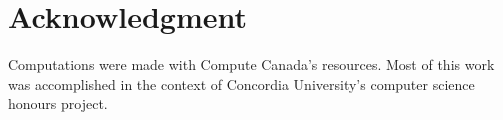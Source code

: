 \documentclass[conference]{IEEEtran}
\begin{document}
\section*{Acknowledgment}

Computations were made with Compute Canada's resources. Most of this work was
accomplished in the context of Concordia University's computer science honours
project.




\vspace{12pt}
\end{document}
